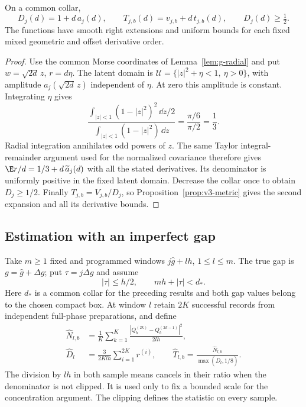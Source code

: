\begin{lemma}\label{lem:v5-residual}
On a common collar,
\begin{equation}\label{eq:v5-residual-smooth}
 D_j(d)=1+d\,a_j(d),\qquad
 T_{j,b}(d)=v_{j,b}+d\,t_{j,b}(d),\qquad D_j(d)\ge\tfrac12.
\end{equation}
The functions have smooth right extensions and uniform bounds for
each fixed mixed geometric and offset derivative order.
\end{lemma}
\begin{proof}
Use the common Morse coordinates of Lemma~\ref{lem:g-radial} and
put $w=\sqrt{2d}\,z$, $r=d\eta$. The latent domain is
$\mathcal U=\{|z|^2+\eta<1,\ \eta>0\}$, with amplitude
$a_j(\sqrt{2d}\,z)$ independent of $\eta$.
At zero this amplitude is constant. Integrating $\eta$ gives
\[
 \frac{\int_{|z|<1}(1-|z|^2)^2\,\dd z/2}
      {\int_{|z|<1}(1-|z|^2)\,\dd z}
 =\frac{\pi/6}{\pi/2}=\frac13.
\]
Radial integration annihilates odd powers of $z$. The same Taylor
integral-remainder argument used for the normalized covariance therefore
gives $\E r/d=1/3+d\,\widetilde a_j(d)$ with all the stated
derivatives. Its denominator is uniformly positive in the fixed
latent domain. Decrease the collar once to obtain $D_j\ge1/2$.
Finally $T_{j,b}=V_{j,b}/D_j$, so
Proposition~\ref{prop:v3-metric} gives the second expansion and all
its derivative bounds.
\end{proof}

\subsection{Estimation with an imperfect gap}
Take $m\ge1$ fixed and programmed windows $j\widehat g+lh$,
$1\le l\le m$. The true gap is $g=\widehat g+\Delta g$; put
$\tau=j\Delta g$ and assume
\begin{equation}\label{eq:v5-residual-window}
 |\tau|\le h/2,\qquad mh+|\tau|<d_*.
\end{equation}
Here $d_*$ is a common collar for the preceding results and both gap
values belong to the chosen compact box. At window $l$ retain $2K$
successful records from independent full-phase preparations, and define
\begin{equation}\label{eq:v5-sample-ratios}
 \begin{split}
 \widehat N_{l,b}&=\frac1K\sum_{k=1}^K
    \frac{|Q_b^{(2k)}-Q_b^{(2k-1)}|^2}{2lh},\\
 \widehat D_l&=\frac{3}{2Klh}\sum_{i=1}^{2K}r^{(i)},\qquad
 \widehat T_{l,b}=\frac{\widehat N_{l,b}}
                            {\max(\widehat D_l,1/8)}.
 \end{split}
\end{equation}
The division by $lh$ in both sample means cancels in their ratio when
the denominator is not clipped. It is used only to fix a bounded
scale for the concentration argument. The clipping defines the
statistic on every sample.

